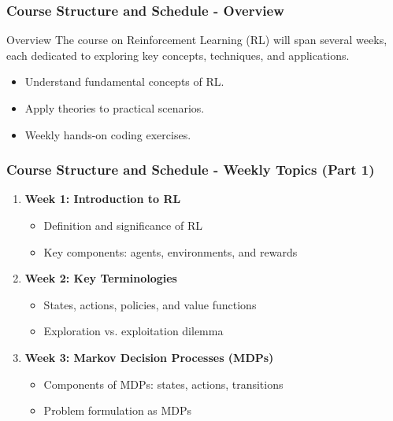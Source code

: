 \documentclass[aspectratio=169]{beamer}
\begin{document}
\begin{frame}[fragile]
    \frametitle{Course Structure and Schedule - Overview}
    \begin{block}{Overview}
        The course on Reinforcement Learning (RL) will span several weeks, each dedicated to exploring key concepts, techniques, and applications.
    \end{block}
    \begin{itemize}
        \item Understand fundamental concepts of RL.
        \item Apply theories to practical scenarios.
        \item Weekly hands-on coding exercises.
    \end{itemize}
\end{frame}

\begin{frame}[fragile]
    \frametitle{Course Structure and Schedule - Weekly Topics (Part 1)}
    \begin{enumerate}
        \item \textbf{Week 1: Introduction to RL}
            \begin{itemize}
                \item Definition and significance of RL
                \item Key components: agents, environments, and rewards
            \end{itemize}
        \item \textbf{Week 2: Key Terminologies}
            \begin{itemize}
                \item States, actions, policies, and value functions
                \item Exploration vs. exploitation dilemma
            \end{itemize}
        \item \textbf{Week 3: Markov Decision Processes (MDPs)}
            \begin{itemize}
                \item Components of MDPs: states, actions, transitions
                \item Problem formulation as MDPs
            \end{itemize}
    \end{enumerate}
\end{frame}
\end{document}

